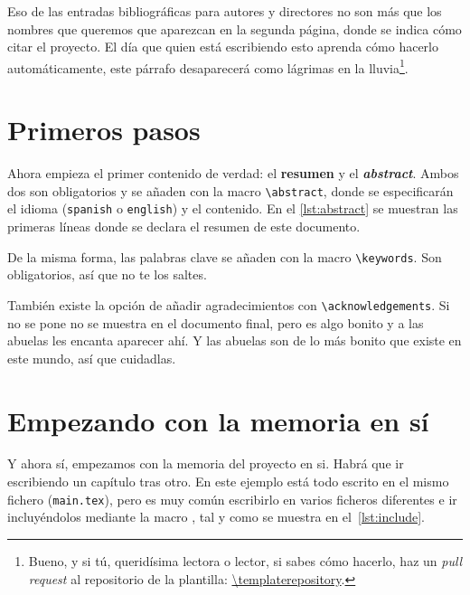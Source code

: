 \documentclass[%
    school=etsisi,%
    type=pfg,%
    degree=61CD,%
]{upm-report}
\begin{document}
Eso de las entradas bibliográficas para autores y directores no son más
que los nombres que queremos que aparezcan en la segunda página, donde
se indica cómo citar el proyecto. El día que quien está escribiendo esto
aprenda cómo hacerlo automáticamente, este párrafo desaparecerá como
lágrimas en la lluvia\footnote{Bueno, y si tú, queridísima lectora o
lector, si sabes cómo hacerlo, haz un \textit{pull request} al
repositorio de la plantilla: \url{\templaterepository}.}.

\section{Primeros pasos}

Ahora empieza el primer contenido de verdad: el \textbf{resumen} y el
\textbf{\textit{abstract}}. Ambos dos son obligatorios y se añaden con
la macro \lstinline{\abstract}, donde se especificarán el idioma
(\texttt{spanish} o \texttt{english}) y el contenido. En el
\autoref{lst:abstract} se muestran las primeras líneas donde se declara
el resumen de este documento.



De la misma forma, las palabras clave se añaden con la macro
\lstinline{\keywords}. Son obligatorios, así que no te los saltes.



También existe la opción de añadir agradecimientos con
\lstinline{\acknowledgements}. Si no se pone no se muestra en el
documento final, pero es algo bonito y a las abuelas les encanta
aparecer ahí. Y las abuelas son de lo más bonito que existe en este
mundo, así que cuidadlas.

\section{Empezando con la memoria en sí}

Y ahora sí, empezamos con la memoria del proyecto en si. Habrá que ir
escribiendo un capítulo tras otro. En este ejemplo está todo escrito en
el mismo fichero (\texttt{main.tex}), pero es muy común escribirlo en
varios ficheros diferentes e ir incluyéndolos mediante la macro
\lstinline{}, tal y como se muestra en el~\autoref{lst:include}.
\end{document}
